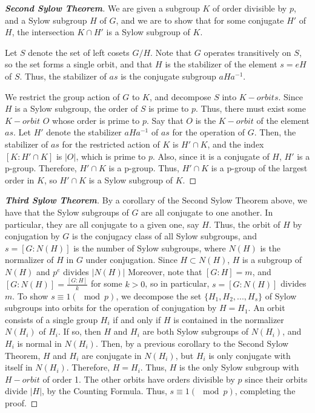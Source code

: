 \documentclass[12pt]{article}
\theoremstyle{definition}
\theoremstyle{remark}
\numberwithin{equation}{section}
\newcommand\B[1]{\textbf{ #1}}
\begin{document}
\begin{proof}
        [\B{Second Sylow Theorem}] We are given a subgroup $K$ of order divisible by $p$, and a Sylow subgroup $H$ of $G$, and we are to show that for some conjugate $H'$ of $H$, the intersection $K\cap H'$ is a Sylow subgroup of $K$.


        Let $S$ denote the set of left cosets $G/H$. Note that $G$ operates transitively on $S$, so the set forms a single orbit, and that $H$ is the stabilizer of the element $s= eH$ of $S$. Thus, the stabilizer of $as$ is the conjugate subgroup $aHa^{-1}$.


        We restrict the group action of $G$ to $K$, and decompose $S$ into $K-orbits$. Since $H$ is a Sylow subgroup, the order of $S$ is prime to $p$. Thus, there must exist some $K-orbit$ $O$ whose order is prime to $p$. Say that $O$ is the $K-orbit$ of the element $as$. Let $H'$ denote the stabilizer $aHa^{-1}$ of $as$ for the operation of $G$. Then, the stabilizer of $as$ for the restricted action of $K$ is $H'\cap K$, and the index $[K:H'\cap K]$ is $|O|$, which is prime to $p$. Also, since it is a conjugate of $H$, $H'$ is a p-group. Therefore, $H' \cap K$ is a p-group. Thus, $H' \cap K$ is a p-group of the largest order in $K$, so $H' \cap K$ is a Sylow subgroup of $K$.
\end{proof}

\vspace{15pt}

\begin{proof}
        [\B{Third Sylow Theorem}] By a corollary of the Second Sylow Theorem above, we have that the Sylow subgroups of $G$ are all conjugate to one another. In particular, they are all conjugate to a given one, say $H$. Thus, the orbit of $H$ by conjugation by $G$ is the conjugacy class of all Sylow subgroups, and $s = [G: N(H)]$ is the number of Sylow subgroups, where $N(H)$ is the normalizer of $H$ in $G$ under conjugation. Since $H \subset N(H)$, $H$ is a subgroup of $N(H)$ and $p^e$ divides $|N(H)|$ Moreover, note that $[G:H] = m$, and $[G:N(H)] = \frac{[G:H]}{k}$ for some $k > 0$, so in particular, $s = [G:N(H)]$ divides $m$. To show $s \equiv 1 (\mod p)$, we decompose the set $\{H_1,H_2,...,H_s\}$ of Sylow subgroups into orbits for the operation of conjugation by $H = H_1$. An orbit consists of a single group $H_i$ if and only if $H$ is contained in the normalizer $N(H_i)$ of $H_i$. If so, then $H$ and $H_i$ are both Sylow subgroups of $N(H_i)$, and $H_i$ is normal in $N(H_i)$. Then, by a previous corollary to the Second Sylow Theorem, $H$ and $H_i$ are conjugate in $N(H_i)$, but $H_i$ is only conjugate with itself in $N(H_i)$. Therefore, $H = H_i$. Thus, $H$ is the only Sylow subgroup with $H-orbit$ of order 1. The other orbits have orders divisible by $p$ since their orbits divide $|H|$, by the Counting Formula. Thus, $s \equiv 1 (\mod p)$, completing the proof.
\end{proof}
\end{document}
